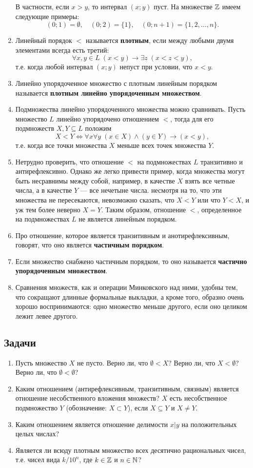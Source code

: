\begin{enumerate}
В частности, если $x>y$, то интервал $(x;y)$ пуст. На множестве $\mathbb Z$ имеем следующие примеры:
$$
(0;1) = \emptyset,\quad (0;2) = \{1\}, \quad (0;n+1) = \{1,2,\dots, n\}.
$$
\item Линейный порядок $<$ называется \textbf{плотным}, если между любыми двумя элементами всегда есть третий: 
$$
\forall x,y\in L\;(x<y)\to\exists z\; (x<z<y),
$$
т.е. когда любой интервал $(x;y)$ непуст при условии, что $x<y$.
\item Линейно упорядоченное множество с плотным линейным порядком называется \textbf{плотным линейно упорядоченным множеством}.
\item Подмножества линейно упорядоченного множества можно сравнивать. Пусть множество $L$ линейно упорядочено отношением $<$, тогда для его подмножеств $X,Y\subseteq L$ положим
$$
X<Y\Leftrightarrow \forall x\forall y\;(x\in X)\land(y\in Y)\to (x<y),
$$
т.е. когда все точки множества $X$ меньше всех точек множества $Y$.
\item Нетрудно проверить, что отношение $<$ на подмножествах $L$ транзитивно и антирефлексивно. Однако же легко привести пример, когда множества могут быть несравнимы между собой, например, в качестве  $X$ взять все четные числа, а в качестве $Y$ --- все нечетыне числа. несмотря на то, что эти множества не пересекаются, невозможно сказать, что $X<Y$ или что $Y<X$, и уж тем более неверно $X=Y$. Таким образом, отношение $<$, определенное на подмножествах $L$ не является линейным порядком.
\item Про отношение, которое является транзитивным и анотирефлексивным, говорят, что оно является \textbf{частичным порядком}.
\item Если множество снабжено частичным порядком, то оно называется \textbf{частично упорядоченным множеством}.
\item Сравнения множеств, как и операции Минковского над ними, удобны тем, что сокращают длинные формальные выкладки, а кроме того, образно очень хорошо воспринимаются: одно множество меньше другого, если оно целиком лежит левее другого.
\end{enumerate}

\subsection*{Задачи}

\begin{enumerate}
\item Пусть множество $X$ не пусто. Верно ли, что $\emptyset<X$? Верно ли, что $X<\emptyset$? Верно ли, что $\emptyset<\emptyset$?
\item Каким отношением (антирефлексивным, транзитивным, связным) является отношение несобственного вложения множеств? $X$ есть несобственное подмножество $Y$ (обозначение: $X\subset Y$), если $X\subseteq Y$ и $X\ne Y$.
\item Каким отношением является отношение делимости $x|y$ на положительных целых числах?
\item Является ли всюду плотным множество всех десятично рациональных чисел, т.е. чисел вида $k/10^n$, где $k\in \mathbb Z$ и $n\in\mathbb N$?
\end{enumerate}


